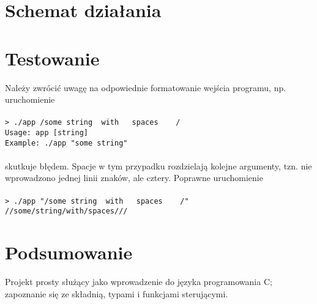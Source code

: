 \documentclass[a4paper, 12pt]{article}
\begin{document}
\section*{Schemat działania}
\begin{center}
\end{center}

\section*{Testowanie}
Należy zwrócić uwagę na odpowiednie formatowanie wejścia programu, np. uruchomienie
\\\\
\lstinline{> ./app /some string  with   spaces    /}\\
\lstinline{Usage: app [string]}\\
\lstinline{Example: ./app "some string"}
\\\\
skutkuje błędem. Spacje w tym przypadku rozdzielają kolejne argumenty, tzn. nie wprowadzono jednej linii znaków, ale cztery. Poprawne uruchomienie
\\\\
\lstinline{> ./app "/some string  with   spaces    /"}\\
\lstinline{//some/string/with/spaces///}

\section*{Podsumowanie}
Projekt prosty służący jako wprowadzenie do języka programowania C; zapoznanie się ze składnią, typami i funkcjami sterującymi.
\end{document}
